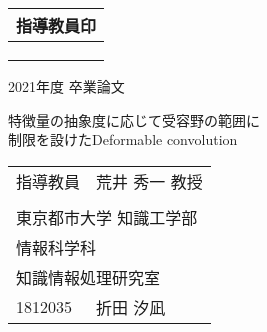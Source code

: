 \begin{titlepage}

	\begin{flushright}
		\begin{tabular}{|c|}
			\hline
			指導教員印	\\ \hline
			\\
			\\
			\\ \hline
		\end{tabular}
	\end{flushright}

	\begin{center}

		\vspace{1cm}

		\huge

		2021年度 卒業論文

		\vspace{2cm}

		特徴量の抽象度に応じて受容野の範囲に\\
		制限を設けたDeformable convolution

		\vspace{7cm}

	\end{center}

	\Large

	\begin{flushright}
		\begin{tabular}{ll}
			指導教員	&荒井 秀一 教授					\\ \\
			\multicolumn{2}{l}{東京都市大学 知識工学部}	\\
			\multicolumn{2}{l}{情報科学科}				\\
			\multicolumn{2}{l}{知識情報処理研究室}		\\
			1812035		&折田 汐凪					\\
		\end{tabular}
	\end{flushright}

\end{titlepage}
